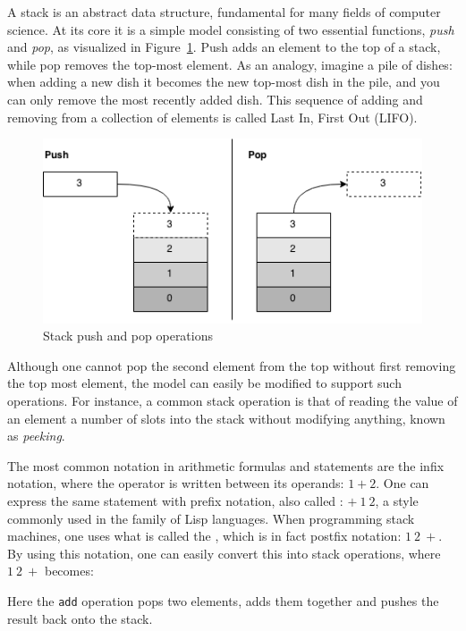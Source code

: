 A stack is an abstract data structure, fundamental for many fields of computer
science. At its core it is a simple model consisting of two essential functions,
{\it push} and {\it pop}, as visualized in Figure~\ref{fig:stack}. Push adds an
element to the top of a stack, while pop removes the top-most element. As an
analogy, imagine a pile of dishes: when adding a new dish it becomes the new
top-most dish in the pile, and you can only remove the most recently added
dish. This sequence of adding and removing from a collection of elements is
called Last In, First Out (LIFO).
\begin{figure}[h]
  \centering
  \includegraphics[scale=0.6]{images/stack.png}
  \caption{Stack push and pop operations}
\label{fig:stack}
\end{figure}

Although one cannot pop the second element from the top without first removing
the top most element, the model can easily be modified to support such
operations. For instance, a common stack operation is that of reading the value
of an element a number of slots into the stack without modifying anything, known
as {\it peeking}.

The most common notation in arithmetic formulas and statements are the infix
notation, where the operator is written between its operands: $1 + 2$. One can
express the same statement with prefix notation, also called : $+\ 1\ 2$, a style commonly used in the family of Lisp
languages. When programming stack machines, one uses what is called the
, which is in fact postfix notation: $1\ 2\ +$. By
using this notation, one can easily convert this into stack operations, where
$1\ 2\ +$ becomes:
\begin{stackops}
\end{stackops}

Here the {\tt add} operation pops two elements, adds them together and pushes
the result back onto the stack.

